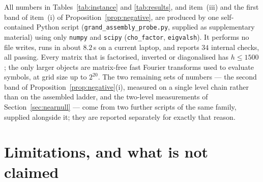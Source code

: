 \documentclass[11pt,a4paper]{article}
\theoremstyle{plain}
\theoremstyle{definition}
\begin{document}
All numbers in Tables~\ref{tab:instance} and \ref{tab:results}, and item~(iii) and the
first band of item~(i) of Proposition~\ref{prop:negative}, are produced by one
self-contained Python script (\texttt{grand\_assembly\_probe.py}, supplied as
supplementary material) using only \texttt{numpy} and \texttt{scipy}
(\texttt{cho\_factor}, \texttt{eigvalsh}). It performs no file writes, runs in about
$8.2$\,s on a current laptop, and reports $34$ internal checks, all passing. Every
matrix that is factorised, inverted or diagonalised has $h\le1500$; the only larger
objects are matrix-free fast Fourier transforms used to evaluate symbols, at grid
size up to $2^{20}$. The two remaining sets of numbers --- the second band of
Proposition~\ref{prop:negative}(i), measured on a single level chain rather than on
the assembled ladder, and the two-level measurements of
Section~\ref{sec:nearnull} --- come from two further scripts of the same family,
supplied alongside it; they are reported separately for exactly that reason.

\section{Limitations, and what is not claimed}
\label{sec:limits}
\end{document}
